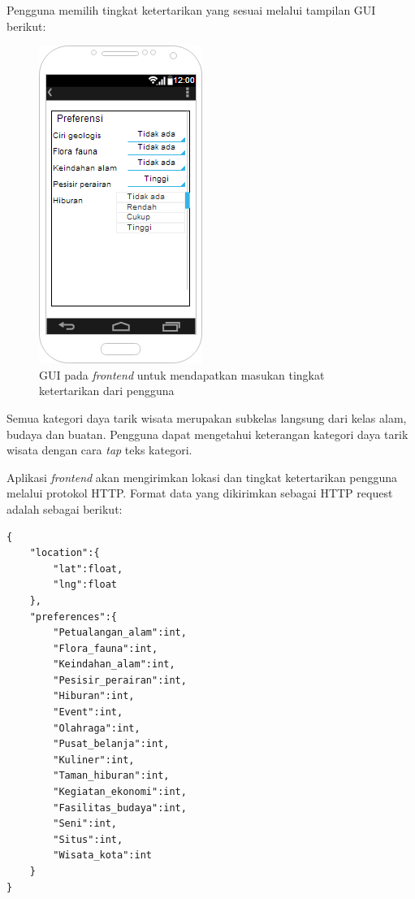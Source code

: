 Pengguna memilih tingkat ketertarikan yang sesuai melalui tampilan GUI berikut:
\begin{figure}[h!]
    \centering
    \includegraphics[scale=0.6]{img/gui-pref.png}
    \caption{GUI pada \textit{frontend} untuk mendapatkan masukan tingkat ketertarikan dari pengguna}
    \label{fig:guipref}
\end{figure}
\par
Semua kategori daya tarik wisata merupakan subkelas langsung dari kelas alam, budaya dan buatan. Pengguna dapat mengetahui keterangan kategori daya tarik wisata dengan cara
\textit{tap} teks kategori.

\par
Aplikasi \textit{frontend} akan mengirimkan lokasi dan tingkat ketertarikan pengguna melalui protokol HTTP. Format data yang dikirimkan sebagai HTTP request adalah sebagai
berikut:
\begin{lstlisting}
{	
	"location":{
		"lat":float,
		"lng":float
	},
	"preferences":{
		"Petualangan_alam":int,
		"Flora_fauna":int,
		"Keindahan_alam":int,
		"Pesisir_perairan":int,
		"Hiburan":int,
		"Event":int,
		"Olahraga":int,
		"Pusat_belanja":int,
		"Kuliner":int,
		"Taman_hiburan":int,
		"Kegiatan_ekonomi":int,
		"Fasilitas_budaya":int,
		"Seni":int,
		"Situs":int,
		"Wisata_kota":int
	}
}
\end{lstlisting}

